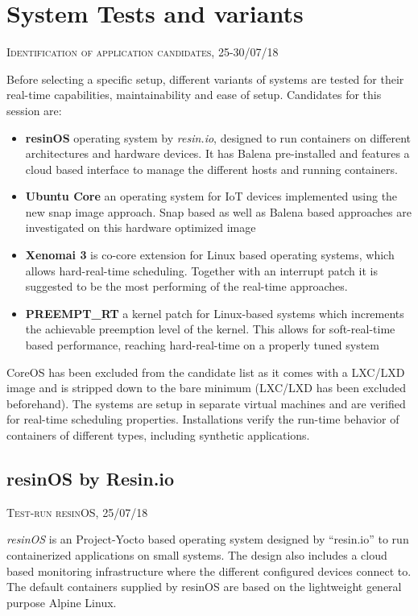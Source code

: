 \documentclass[]{scrartcl}
\begin{document}
\section{System Tests and variants}

{\small\textsc{Identification of application candidates, 25-30/07/18} \bigskip}

Before selecting a specific setup, different variants of systems are tested for their real-time capabilities, maintainability and ease of setup. Candidates for this session are:

\begin{itemize}
	\item \textbf{resinOS} operating system by \textit{resin.io}, designed to run containers on different architectures and hardware devices. It has Balena pre-installed and features a cloud based interface to manage the different hosts and running containers.
	\item \textbf{Ubuntu Core} an operating system for IoT devices implemented using the new snap image approach. Snap based as well as Balena based approaches are investigated on this hardware optimized image
	\item \textbf{Xenomai 3} is co-core extension for Linux based operating systems, which allows hard-real-time scheduling. Together with an interrupt patch it is suggested to be the most performing of the real-time approaches.
	\item \textbf{PREEMPT\_RT} a kernel patch for Linux-based systems which increments the achievable preemption level of the kernel. This allows for soft-real-time based performance, reaching hard-real-time on a properly tuned system
\end{itemize}

CoreOS has been excluded from the candidate list as it comes with a LXC/LXD image and is stripped down to the bare minimum (LXC/LXD has been excluded beforehand). The systems are setup in separate virtual machines and are verified for real-time scheduling properties. Installations verify the run-time behavior of containers of different types, including synthetic applications.

\subsection{resinOS by Resin.io}

{\small\textsc{Test-run resinOS, 25/07/18} \bigskip}

\textit{resinOS} is an Project-Yocto based operating system designed by ``resin.io'' to run containerized applications on small systems. The design also includes a cloud based monitoring infrastructure where the different configured devices connect to. The default containers supplied by resinOS are based on the lightweight general purpose Alpine Linux.
\end{document}

